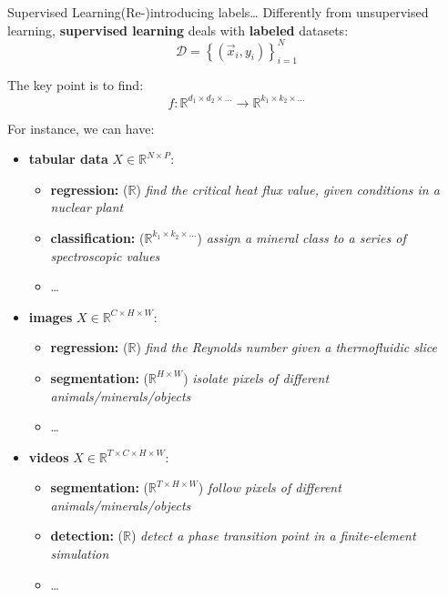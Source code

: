 \begin{frame}{Supervised Learning}{(Re-)introducing labels\dots}
    Differently from unsupervised learning, \textbf{supervised learning} deals with \textbf{labeled} datasets:
    \begin{equation*}
        \mathcal{D} = \left\lbrace \left(\vec{x}_i, y_i\right) \right\rbrace_{i = 1}^N
    \end{equation*}

    \vfill \pause

    The key point is to find:
    \begin{equation*}
        f\colon \mathbb{R}^{d_1 \times d_2 \times \dots} \to \mathbb{R}^{k_1 \times k_2 \times \dots}
    \end{equation*}
    {\footnotesize
    For instance, we can have:
    \begin{itemize}
        \item \textbf{tabular data} $X \in \mathbb{R}^{N \times P}$:
              \begin{itemize}
                  \item \textbf{regression:} ($\mathbb{R}$) \emph{find the critical heat flux value, given conditions in a nuclear plant}
                  \item \textbf{classification:} ($\mathbb{R}^{k_1 \times k_2 \times \dots}$) \emph{assign a mineral class to a series of spectroscopic values}
                  \item \dots
              \end{itemize}
        \item \textbf{images} $X \in \mathbb{R}^{C \times H \times W}$:
              \begin{itemize}
                  \item \textbf{regression:} ($\mathbb{R}$) \emph{find the Reynolds number given a thermofluidic slice}
                  \item \textbf{segmentation:} ($\mathbb{R}^{H \times W}$) \emph{isolate pixels of different animals/minerals/objects}
                  \item \dots
              \end{itemize}
        \item \textbf{videos} $X \in \mathbb{R}^{T \times C \times H \times W}$:
              \begin{itemize}
                  \item \textbf{segmentation:} ($\mathbb{R}^{T \times H \times W}$) \emph{follow pixels of different animals/minerals/objects}
                  \item \textbf{detection:} ($\mathbb{R}$) \emph{detect a phase transition point in a finite-element simulation}
                  \item \dots
              \end{itemize}
    \end{itemize}
    }
\end{frame}


